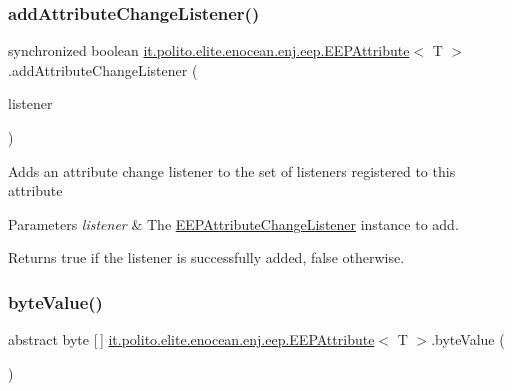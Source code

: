 \subsubsection{\texorpdfstring{add\+Attribute\+Change\+Listener()}{addAttributeChangeListener()}}
{\footnotesize\ttfamily synchronized boolean \hyperlink{classit_1_1polito_1_1elite_1_1enocean_1_1enj_1_1eep_1_1_e_e_p_attribute}{it.\+polito.\+elite.\+enocean.\+enj.\+eep.\+E\+E\+P\+Attribute}$<$ T $>$.add\+Attribute\+Change\+Listener (\begin{DoxyParamCaption}\item[{\hyperlink{interfaceit_1_1polito_1_1elite_1_1enocean_1_1enj_1_1eep_1_1_e_e_p_attribute_change_listener}{E\+E\+P\+Attribute\+Change\+Listener}}]{listener }\end{DoxyParamCaption})}

Adds an attribute change listener to the set of listeners registered to this attribute


\begin{DoxyParams}{Parameters}
{\em listener} & The \hyperlink{interfaceit_1_1polito_1_1elite_1_1enocean_1_1enj_1_1eep_1_1_e_e_p_attribute_change_listener}{E\+E\+P\+Attribute\+Change\+Listener} instance to add. \\
\hline
\end{DoxyParams}
\begin{DoxyReturn}{Returns}
true if the listener is successfully added, false otherwise. 
\end{DoxyReturn}
\hypertarget{classit_1_1polito_1_1elite_1_1enocean_1_1enj_1_1eep_1_1_e_e_p_attribute_abfcf99b7c3b1a3681b28a910ca1f3658}{}\label{classit_1_1polito_1_1elite_1_1enocean_1_1enj_1_1eep_1_1_e_e_p_attribute_abfcf99b7c3b1a3681b28a910ca1f3658} 
\subsubsection{\texorpdfstring{byte\+Value()}{byteValue()}}
{\footnotesize\ttfamily abstract byte \mbox{[}$\,$\mbox{]} \hyperlink{classit_1_1polito_1_1elite_1_1enocean_1_1enj_1_1eep_1_1_e_e_p_attribute}{it.\+polito.\+elite.\+enocean.\+enj.\+eep.\+E\+E\+P\+Attribute}$<$ T $>$.byte\+Value (\begin{DoxyParamCaption}{ }\end{DoxyParamCaption})\hspace{0.3cm}{\ttfamily [abstract]}}


